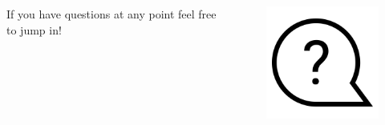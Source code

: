\documentclass{beamer}
\begin{document}
\begin{frame}
    \begin{columns}
        \begin{column}{0.5\textwidth}
            If you have questions at any point feel free to jump in!
        \end{column}
        \begin{column}{0.5\textwidth}
            \begin{figure}
                \centering
                \includegraphics[width=\textwidth,keepaspectratio]{../resources/question.png}
            \end{figure}
        \end{column}
    \end{columns}
\end{frame}
\end{document}
